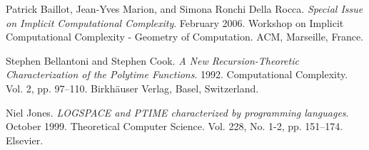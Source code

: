 \begin{thebibliography}{9} %


Patrick Baillot, Jean-Yves Marion, and Simona Ronchi Della Rocca. \emph{Special
Issue on Implicit Computational Complexity}. February 2006. Workshop on
Implicit Computational Complexity - Geometry of Computation. ACM, Marseille,
France.


Stephen Bellantoni and Stephen Cook. \emph{A New Recursion-Theoretic
Characterization of the Polytime Functions}. 1992. Computational Complexity.
Vol. 2, pp. 97--110. Birkh\"auser Verlag, Basel, Switzerland.


Niel Jones. \emph{LOGSPACE and PTIME characterized by programming languages}.
October 1999. Theoretical Computer Science. Vol. 228, No. 1-2, pp. 151--174. Elsevier.

\end{thebibliography}
